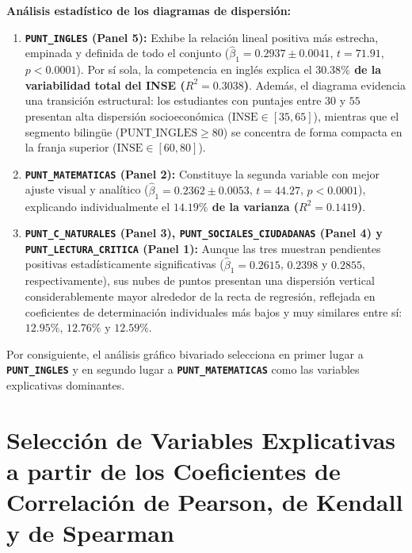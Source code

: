 \documentclass[11pt,letterpaper]{article}
\begin{document}
\textbf{Análisis estadístico de los diagramas de dispersión:}
\begin{enumerate}
    \item \textbf{\texttt{PUNT\_INGLES} (Panel 5):} Exhibe la relación lineal positiva más estrecha, empinada y definida de todo el conjunto ($\hat{\beta}_1 = 0.2937 \pm 0.0041$, $t = 71.91$, $p < 0.0001$). Por sí sola, la competencia en inglés explica el \textbf{$30.38\%$ de la variabilidad total del INSE ($R^2 = 0.3038$)}. Además, el diagrama evidencia una transición estructural: los estudiantes con puntajes entre $30$ y $55$ presentan alta dispersión socioeconómica ($\text{INSE} \in [35, 65]$), mientras que el segmento bilingüe ($\text{PUNT\_INGLES} \ge 80$) se concentra de forma compacta en la franja superior ($\text{INSE} \in [60, 80]$).
    \item \textbf{\texttt{PUNT\_MATEMATICAS} (Panel 2):} Constituye la segunda variable con mejor ajuste visual y analítico ($\hat{\beta}_1 = 0.2362 \pm 0.0053$, $t = 44.27$, $p < 0.0001$), explicando individualmente el \textbf{$14.19\%$ de la varianza ($R^2 = 0.1419$)}.
    \item \textbf{\texttt{PUNT\_C\_NATURALES} (Panel 3), \texttt{PUNT\_SOCIALES\_CIUDADANAS} (Panel 4) y \texttt{PUNT\_LECTURA\_CRITICA} (Panel 1):} Aunque las tres muestran pendientes positivas estadísticamente significativas ($\hat{\beta}_1 = 0.2615$, $0.2398$ y $0.2855$, respectivamente), sus nubes de puntos presentan una dispersión vertical considerablemente mayor alrededor de la recta de regresión, reflejada en coeficientes de determinación individuales más bajos y muy similares entre sí: \textbf{$12.95\%$}, \textbf{$12.76\%$} y \textbf{$12.59\%$}.
\end{enumerate}
Por consiguiente, el análisis gráfico bivariado selecciona en primer lugar a \textbf{\texttt{PUNT\_INGLES}} y en segundo lugar a \textbf{\texttt{PUNT\_MATEMATICAS}} como las variables explicativas dominantes.

\section{Selección de Variables Explicativas a partir de los Coeficientes de Correlación de Pearson, de Kendall y de Spearman}
\end{document}
